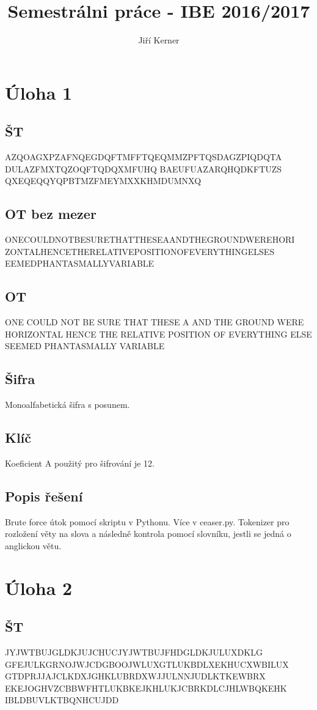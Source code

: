 \documentclass[12pt]{article} %
\title{Semestrálni práce  - IBE 2016/2017}
\author{Jiří Kerner}
\begin{document}
\maketitle

\section{Úloha 1}
\subsection{ŠT}
AZQOAGXPZAFNQEGDQFTMFFTQEQMMZPFTQSDAGZPIQDQTA
DULAZFMXTQZOQFTQDQXMFUHQ
BAEUFUAZARQHQDKFTUZS
QXEQEQQYQPBTMZFMEYMXXKHMDUMNXQ

\subsection{OT bez mezer}
ONECOULDNOTBESURETHATTHESEAANDTHEGROUNDWEREHORI
ZONTALHENCETHERELATIVEPOSITIONOFEVERYTHINGELSES
EEMEDPHANTASMALLYVARIABLE
\subsection{OT}
ONE COULD NOT BE SURE THAT THESE A AND THE GROUND
 WERE HORIZONTAL HENCE THE RELATIVE POSITION OF 
 EVERYTHING ELSE SEEMED PHANTASMALLY VARIABLE
\subsection{Šifra}
Monoalfabetická šifra s posunem.
\subsection{Klíč}
Koeficient A použitý pro šifrování je 12.
\subsection{Popis řešení}
Brute force útok pomocí skriptu v Pythonu. Více v ceaser.py. Tokenizer pro rozložení věty
na slova a následně kontrola pomocí slovníku, jestli se jedná o anglickou větu.





\section{Úloha 2}
\subsection{ŠT}
JYJWTBUJGLDKJUJCHUCJYJWTBUJFHDGLDKJULUXDKLG
GFEJULKGRNOJWJCDGBOOJWLUXGTLUKBDLXEKHUCXWBILUX
GTDPRJJAJCLKDXJGHKLUBRDXWJJULNNJUDLKTKEWBRX
EKEJOGHVZCBBWFHTLUKBKEJKHLUKJCBRKDLCJHLWBQKEHK
IBLDBUVLKTBQNHCUJDD
\end{document}
